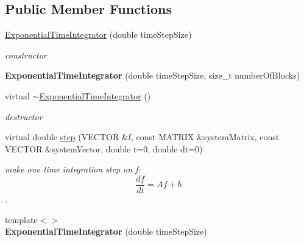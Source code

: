 \subsection*{Public Member Functions}
\begin{DoxyCompactItemize}
\item 
\hypertarget{classnatrium_1_1ExponentialTimeIntegrator_a3a3e7b0c53b5c083dbdb7b3d625d8087}{
\hyperlink{classnatrium_1_1ExponentialTimeIntegrator_a3a3e7b0c53b5c083dbdb7b3d625d8087}{ExponentialTimeIntegrator} (double timeStepSize)}
\label{classnatrium_1_1ExponentialTimeIntegrator_a3a3e7b0c53b5c083dbdb7b3d625d8087}

\begin{DoxyCompactList}\small\item\em constructor \item\end{DoxyCompactList}\item 
\hypertarget{classnatrium_1_1ExponentialTimeIntegrator_a7da2892aead7c5e1fec82be549dcb37b}{
{\bfseries ExponentialTimeIntegrator} (double timeStepSize, size\_\-t numberOfBlocks)}
\label{classnatrium_1_1ExponentialTimeIntegrator_a7da2892aead7c5e1fec82be549dcb37b}

\item 
\hypertarget{classnatrium_1_1ExponentialTimeIntegrator_ad85e62117ec3dbfebfbccd6ad1135d8c}{
virtual \hyperlink{classnatrium_1_1ExponentialTimeIntegrator_ad85e62117ec3dbfebfbccd6ad1135d8c}{$\sim$ExponentialTimeIntegrator} ()}
\label{classnatrium_1_1ExponentialTimeIntegrator_ad85e62117ec3dbfebfbccd6ad1135d8c}

\begin{DoxyCompactList}\small\item\em destructor \item\end{DoxyCompactList}\item 
virtual double \hyperlink{classnatrium_1_1ExponentialTimeIntegrator_ae0a9cff9bdafab123016db72d1439ef8}{step} (VECTOR \&f, const MATRIX \&systemMatrix, const VECTOR \&systemVector, double t=0, double dt=0)
\begin{DoxyCompactList}\small\item\em make one time integration step on f: \[ \frac{df}{dt} = Af+b \]. \item\end{DoxyCompactList}\item 
\hypertarget{classnatrium_1_1ExponentialTimeIntegrator_a7b68727897acae02ff025c39a56a4bf6}{
{\footnotesize template$<$$>$ }\\{\bfseries ExponentialTimeIntegrator} (double timeStepSize)}
\label{classnatrium_1_1ExponentialTimeIntegrator_a7b68727897acae02ff025c39a56a4bf6}


\end{DoxyCompactItemize}
